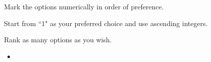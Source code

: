 \documentclass[14pt,onesided]{letter}
\def\option{\item[$\vcenter{\hbox{\Huge$\Box$}}$]}
\begin{document}
    \begin{center}
        \Huge{}
        \LARGE{}


        \Large{\textbf{}}
    \end{center}

    Mark the options  numerically in order of preference. 

    Start from ``1" as your preferred choice and use ascending integers.

    Rank as many options as you wish.

    \begin{itemize}
            \option {}
    \end{itemize}
\end{document}
